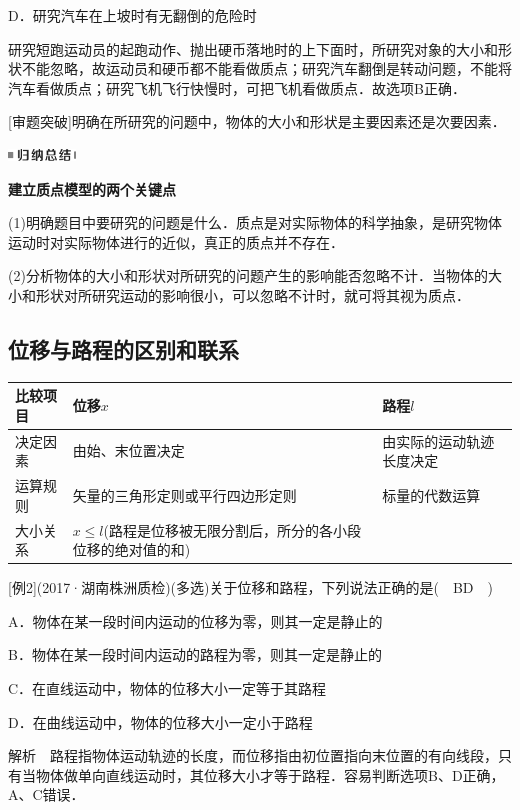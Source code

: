 \documentclass[cn,10.5pt,chinese,mac,chinesefont=founder]{elegantbook}
\begin{document}
D．研究汽车在上坡时有无翻倒的危险时
\begin{solution}
	研究短跑运动员的起跑动作、抛出硬币落地时的上下面时，所研究对象的大小和形状不能忽略，故运动员和硬币都不能看做质点；研究汽车翻倒是转动问题，不能将汽车看做质点；研究飞机飞行快慢时，可把飞机看做质点．故选项B正确．
	
	{[}审题突破{]}明确在所研究的问题中，物体的大小和形状是主要因素还是次要因素．
\end{solution}



\begin{center}\includegraphics[width=0.70833in,height=0.125in]{media/image13.png}

\textbf{建立质点模型的两个关键点}
\end{center}


(1)明确题目中要研究的问题是什么．质点是对实际物体的科学抽象，是研究物体运动时对实际物体进行的近似，真正的质点并不存在．

(2)分析物体的大小和形状对所研究的问题产生的影响能否忽略不计．当物体的大小和形状对所研究运动的影响很小，可以忽略不计时，就可将其视为质点．



\subsection{位移与路程的区别和联系}
\begin{longtable}[]{@{}lll@{}}
\toprule
比较项目 & 位移$x$ & 路程$l$\tabularnewline
\midrule
\endhead
决定因素 & 由始、末位置决定 & 由实际的运动轨迹长度决定\tabularnewline
运算规则 & 矢量的三角形定则或平行四边形定则 &
标量的代数运算\tabularnewline
大小关系 & $x\le l$(路程是位移被无限分割后，所分的各小段位移的绝对值的和)
&\tabularnewline
\bottomrule
\end{longtable}

{[}例2{]}(2017·湖南株洲质检)(多选)关于位移和路程，下列说法正确的是(　BD　)

A．物体在某一段时间内运动的位移为零，则其一定是静止的

B．物体在某一段时间内运动的路程为零，则其一定是静止的

C．在直线运动中，物体的位移大小一定等于其路程

D．在曲线运动中，物体的位移大小一定小于路程

解析　路程指物体运动轨迹的长度，而位移指由初位置指向末位置的有向线段，只有当物体做单向直线运动时，其位移大小才等于路程．容易判断选项B、D正确，A、C错误．
\end{document}
